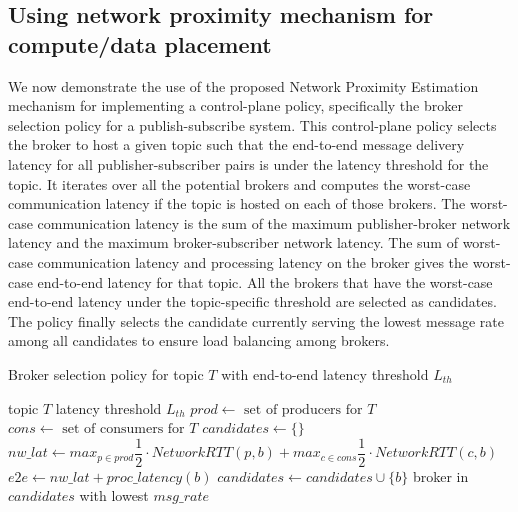 \subsection{Using network proximity mechanism for compute/data placement}
We now demonstrate the use of the proposed Network Proximity Estimation mechanism for implementing a control-plane policy, specifically the broker selection policy for a publish-subscribe system. This control-plane policy selects the broker to host a given topic such that the end-to-end message delivery latency for all publisher-subscriber pairs is under the latency threshold for the topic. It iterates over all the potential brokers and computes the worst-case communication latency if the topic is hosted on each of those brokers. The worst-case communication latency is the sum of the maximum publisher-broker network latency and the maximum broker-subscriber network latency. The sum of worst-case communication latency and processing latency on the broker gives the worst-case end-to-end latency for that topic. All the brokers that have the worst-case end-to-end latency under the topic-specific threshold are selected as candidates. The policy finally selects the candidate currently serving the lowest message rate among all candidates to ensure load balancing among brokers.

\begin{algorithm}
\caption{Broker selection policy for topic $T$ with end-to-end latency threshold $L_{th}$}
\begin{algorithmic}
\Require topic $T$
\Require latency threshold $L_{th}$
\State $prod \gets \text{ set of producers for }T$
\State $cons \gets \text{ set of consumers for }T$
\State $candidates \gets \{\}$
    \State $nw\_lat \gets max_{p \in prod} \dfrac{1}{2} \cdot NetworkRTT \left( p, b \right) + max_{c \in cons} \dfrac{1}{2} \cdot NetworkRTT \left( c, b \right)$
    \State $e2e \gets nw\_lat + proc\_latency \left( b \right)$
        \State $candidates \gets candidates \cup \{b\}$
    \EndIf
\EndFor
\Return broker in $candidates$ with lowest $msg\_rate$
\end{algorithmic}
\end{algorithm}

